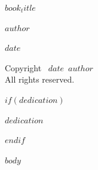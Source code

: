 \documentclass[12pt,openright]{memoir}
\def\booktitle{$book_title$}
\def\bookauthor{$author$}
\def\bookdate{$date$}
\begin{document}
\thispagestyle{empty}
\begin{center}
\vspace*{2in}
{\Huge\scshape\booktitle\par}
\vspace{1.5in}
{\Large\scshape\bookauthor\par}
\vfill
{\large\scshape\bookdate}
\end{center}

\clearpage
\thispagestyle{empty}
\vspace*{\fill}
\begin{center}
Copyright \textcopyright\ \bookdate\ \bookauthor\\
All rights reserved.
\end{center}
\vspace*{\fill}

$if(dedication)$
\clearpage
\thispagestyle{empty}
\vspace*{3in}
\begin{center}
\textit{$dedication$}
\end{center}
$endif$

\mainmatter

$body$
\end{document}

